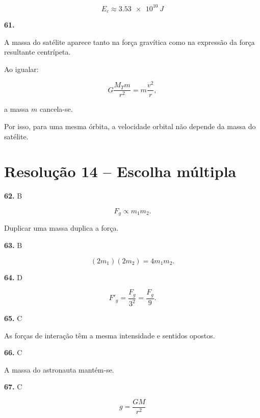 \documentclass[11pt,a4paper]{article}
\begin{document}
\begin{solucaobox}[Questões 57--61]
		\[
		\boxed{
			E_c\approx\SI{3.53e10}{J}
		}
		\]
		
		\vspace{3mm}
		
		\textbf{61.}
		
		A massa do satélite aparece tanto na força gravítica como na expressão
		da força resultante centrípeta.
		
		Ao igualar:
		
		\[
		G\frac{M_Tm}{r^2}
		=
		m\frac{v^2}{r},
		\]
		
		a massa $m$ cancela-se.
		
		Por isso, para uma mesma órbita, a velocidade orbital não depende da
		massa do satélite.
		
	\end{solucaobox}
	
	\section*{Resolução 14 -- Escolha múltipla}
	
	\begin{solucaobox}[Questões 62--67]
		
		\textbf{62.} B
		
		\[
		F_g\propto m_1m_2.
		\]
		
		Duplicar uma massa duplica a força.
		
		\vspace{2mm}
		
		\textbf{63.} B
		
		\[
		(2m_1)(2m_2)=4m_1m_2.
		\]
		
		\vspace{2mm}
		
		\textbf{64.} D
		
		\[
		F'_g=
		\frac{F_g}{3^2}
		=
		\frac{F_g}{9}.
		\]
		
		\vspace{2mm}
		
		\textbf{65.} C
		
		As forças de interação têm a mesma intensidade e sentidos opostos.
		
		\vspace{2mm}
		
		\textbf{66.} C
		
		A massa do astronauta mantém-se.
		
		\vspace{2mm}
		
		\textbf{67.} C
		
		\[
		\boxed{
			g=
			\frac{GM}{r^2}
		}
		\]
		
	\end{solucaobox}
	
\end{document}
